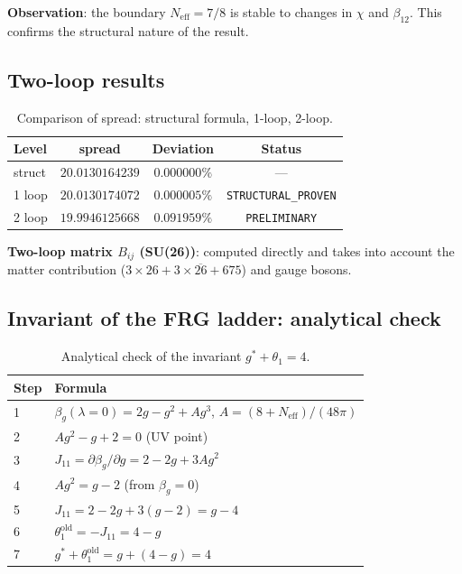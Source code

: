 \documentclass[11pt,a4paper]{article}
\theoremstyle{definition}
\begin{document}
\medskip\noindent
\textbf{Observation}: the boundary $N_{\text{eff}} = 7/8$ is stable
to changes in $\chi$ and $\beta_{12}$. This confirms
the structural nature of the result.

\subsection{Two-loop results}
\label{app:frg-2loop}

\begin{table}[ht]
\centering
\caption{Comparison of spread: structural formula, 1-loop, 2-loop.}
\label{tab:app-frg-2loop}
\begin{tabular}{lccc}
\toprule
Level & spread & Deviation & Status \\
\midrule
struct & $20.0130164239$ & $0.000000\%$ & --- \\
1 loop & $20.0130174072$ & $0.000005\%$ & \texttt{STRUCTURAL\_PROVEN} \\
2 loop & $19.9946125668$ & $0.091959\%$ & \texttt{PRELIMINARY} \\
\bottomrule
\end{tabular}
\end{table}

\medskip\noindent
\textbf{Two-loop matrix $B_{ij}$ (SU(26))}: computed
directly and takes into account the matter contribution ($3 \times 26
+ 3 \times \overline{26} + 675$) and gauge bosons.
\subsection{Invariant of the FRG ladder: analytical check}
\label{app:frg-analytical}

\begin{table}[ht]
\centering
\caption{Analytical check of the invariant \texorpdfstring{$g^* + \theta_1 = 4$}{g^* + \_1 = 4}.}
\label{tab:app-frg-analytical}
\begin{tabular}{ll}
\toprule
Step & Formula \\
\midrule
1 & $\beta_g(\lambda=0) = 2g - g^2 + A g^3$, $A = (8+N_{\text{eff}})/(48\pi)$ \\
2 & $A g^2 - g + 2 = 0$ (UV point) \\
3 & $J_{11} = \partial \beta_g / \partial g = 2 - 2g + 3A g^2$ \\
4 & $A g^2 = g - 2$ (from $\beta_g = 0$) \\
5 & $J_{11} = 2 - 2g + 3(g-2) = g - 4$ \\
6 & $\theta_1^{\text{old}} = -J_{11} = 4 - g$ \\
7 & $g^* + \theta_1^{\text{old}} = g + (4 - g) = 4$ \\
\bottomrule
\end{tabular}
\end{table}
\end{document}
